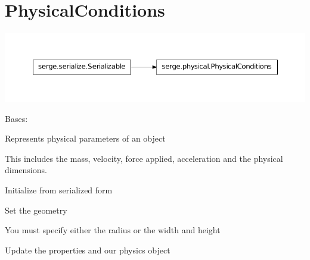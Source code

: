 \documentclass[letterpaper,10pt,english]{sphinxmanual}
\begin{document}
\section{PhysicalConditions}
\label{physical:physicalconditions}
\includegraphics{inheritance-af60168d6ef2a0efccd77ed768d4695ea5a6a28a.pdf}

\begin{fulllineitems}
\label{physical:serge.physical.PhysicalConditions}
Bases: {\hyperref[common:serge.serialize.Serializable]{}}

Represents physical parameters of an object

This includes the mass, velocity, force applied, acceleration
and the physical dimensions.

\begin{fulllineitems}
\label{physical:serge.physical.PhysicalConditions.init}
Initialize from serialized form

\end{fulllineitems}


\begin{fulllineitems}
\label{physical:serge.physical.PhysicalConditions.setGeometry}
Set the geometry

You must specify either the radius or the width and height

\end{fulllineitems}


\begin{fulllineitems}
\label{physical:serge.physical.PhysicalConditions.updateFrom}
Update the properties and our physics object

\end{fulllineitems}


\end{fulllineitems}
\end{document}
